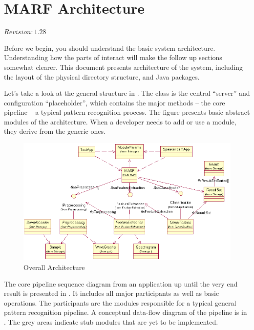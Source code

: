 \chapter{MARF Architecture}

$Revision: 1.28 $

Before we begin, you should understand the basic
{\marf} system  architecture. Understanding how the
parts of {\marf} interact will make the follow up sections
somewhat clearer. This document presents architecture
of the {\marf} system, including the layout of the physical
directory structure, and Java packages.

Let's take a look at the general {\marf} structure in .
The  class is the central ``server'' and configuration ``placeholder'', which contains the major methods --
the core pipeline -- a typical pattern recognition process.
The figure presents basic abstract modules of the architecture.
When a developer needs to add or use a module, they derive
from the generic ones.

\begin{figure}
	\centering
	\includegraphics[angle=90,totalheight=\textheight]{../graphics/arch/arch-general.png}
	\caption{Overall Architecture}
	\label{fig:arch}
\end{figure}

The core pipeline sequence diagram from an application
up until the very end result is presented in . It includes all major
participants as well as basic operations. The participants are the
modules responsible for a typical general pattern recognition pipeline.
A conceptual data-flow diagram of the pipeline is in .
The grey areas indicate stub modules that are yet to be implemented.

